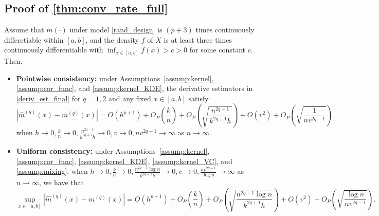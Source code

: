 \documentclass{uwstat572}
\theoremstyle{definition}
\renewcommand{\hat}{\widehat}
\theoremstyle{theorem}
\newenvironment{customthm}[1]
{\renewcommand\theinnercustomthm{#1}\innercustomthm}
{\endinnercustomthm}
\begin{document}
\subsection{Proof of \autoref{thm:conv_rate_full}}
\label{App:proof_thm8}

\begin{customthm}{8}
Assume that $m(\cdot)$ under model \eqref{rand_design} is $(p+3)$ times continuously differetiable within $[a,b]$, and the density $f$ of $X$ is at least three times continuously differentiable with $\inf_{x\in [a,b]} f(x) > c >0$ for some constant $c$. Then,
\begin{itemize}
	\item {\bf Pointwise consistency:} under Assumptions~\ref{assump:kernel}, \ref{assump:cor_func}, and \ref{assump:kernel_KDE}, the derivative estimators in \eqref{deriv_est_final} for $q=1,2$ and any fixed $x\in [a,b]$ satisfy
	$$\left|\hat{m}^{(q)}(x) - m^{(q)}(x)\right| = O\left(h^{p+1}\right) +O_P\left(\frac{k}{n}\right) + O_P\left(\sqrt{\frac{n^{2q-1}}{k^{2q+1}h}}\right) + O(v^2) + O_P\left(\sqrt{\frac{1}{nv^{2q-1}}}\right)$$
	when $h\to 0, \frac{k}{n} \to 0, \frac{n^{2q-1}}{k^{2q+1}h} \to 0, v\to 0, nv^{2q-1} \to \infty$ as $n\to \infty$.
	
	\item {\bf Uniform consistency:} under Assumptions~\ref{assump:kernel}, \ref{assump:cor_func}, \ref{assump:kernel_KDE}, \ref{assump:kernel_VC}, and \ref{assump:mixing}, when $h\to 0, \frac{k}{n} \to 0, \frac{n^{2q-1}\log n}{k^{2q+1}h} \to 0, v\to 0, \frac{nv^{2q-1}}{\log n} \to \infty$ as $n\to \infty$, we have that
	$$\sup_{x\in [a,b]}\left|\hat{m}^{(q)}(x) - m^{(q)}(x) \right| = O\left(h^{p+1}\right) +O_P\left(\frac{k}{n}\right) + O_P\left(\sqrt{\frac{n^{2q-1}\log n}{k^{2q+1}h}}\right) + O(v^2) + O_P\left(\sqrt{\frac{\log n}{nv^{2q-1}}}\right).$$
\end{itemize}
\end{customthm}
\end{document}
